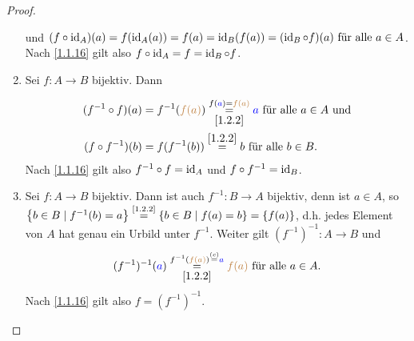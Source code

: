 \documentclass[../../main.tex]{subfiles}
\begin{document}
\begin{proof}
\begin{enumerate}[\normalfont(a)]
\begin{center}
\begin{tikzpicture}
\end{tikzpicture}
\end{center}
und
$(f\circ \id_A)(a) = f(\id_A(a)) = f(a) = \id_B(f(a)) = (\id_B\circ f)(a) \text{ für alle } a\in A$.\\
Nach \ref{1.1.16} gilt also $f\circ \id_A = f = \id_B\circ f$.
\item Sei $f:A\rightarrow B$ bijektiv. Dann\vspace{-2cm}
\begin{center}
\end{center}\vspace{-2cm}
\begin{align*}
(f^{-1}\circ f)(a)&= f^{-1}(\brown{f(a)}) \overset{f(\blue a)=\brown{f(a)}}{\underset{\ref{1.2.2}}=}\blue a \text{ für alle } a\in A\text{ und}\\
(f\circ f^{-1})(b)&= f(f^{-1}(b)) \overset{\ref{1.2.2}}= b \text{ für alle } b\in B.
\end{align*}
Nach \ref{1.1.16} gilt also $f^{-1}\circ f = \id_A$ und $f\circ f^{-1}=\id_B$.
\item Sei $f:A\rightarrow B$ bijektiv. Dann ist auch $f^{-1}:B\rightarrow A$ bijektiv, denn ist $a\in A$, so $\left\{b\in B\mid f^{-1}(b) = a\right\}\overset{\text{\ref{1.2.2}}}=\left\{b\in B\mid f(a) = b\right\} = \left\{f(a)\right\}$, d.h. jedes Element von $A$ hat genau ein Urbild unter $f^{-1}$. Weiter gilt $(f^{-1})^{-1}:A\rightarrow B$ und
\[(f^{-1})^{-1}(\blue a)\overset{{f^{-1}(\brown{f(a)})}\overset{(c)}=\blue a}{\underset{\ref{1.2.2}}=}\brown{f(a)}
\text{ für alle }a\in A.\]
Nach \ref{1.1.16} gilt also $f=(f^{-1})^{-1}$.
\end{enumerate}
\end{proof}

\end{document}
